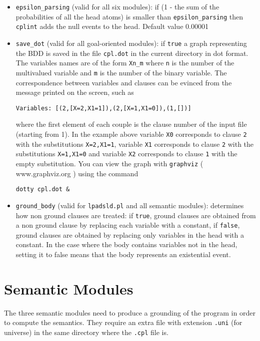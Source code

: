 \documentclass[a4paper,12pt]{article}
\newcommand{\href}[2]{\Link[#1]{}{} #2 \EndLink}
\begin{document}
\begin{itemize}
\item 
	 \verb|epsilon_parsing| (valid for all six modules): if (1 - the sum of the probabilities of all the head atoms) is smaller than 
    \verb|epsilon_parsing|
		then \texttt{cplint} adds the null events to the head. Default value 0.00001
\item 	\verb|save_dot| (valid for all goal-oriented modules): if \texttt{true} a graph representing the BDD is saved in the file \texttt{cpl.dot} in the current directory in dot format.
		The variables names are of the form \verb|Xn_m| where \texttt{n} is the number of the multivalued
		variable and \texttt{m} is the number of the binary variable. The correspondence between variables and 
		clauses can be evinced from the message printed on the screen, such as 
\begin{verbatim}
Variables: [(2,[X=2,X1=1]),(2,[X=1,X1=0]),(1,[])]
\end{verbatim}
		where the first element of each couple is the clause number of the input file (starting from 1).
		In the example above variable \texttt{X0} corresponds to clause \texttt{2} with the substitutions \texttt{X=2,X1=1},
		variable \texttt{X1} corresponds to clause \texttt{2} with the substitutions \texttt{X=1,X1=0} and
		variable \texttt{X2} corresponds to clause \texttt{1} with the empty substitution.
		You can view the graph with \texttt{graphviz} (\href{www.graphviz.org}{www.graphviz.org}) using the
		command
\begin{verbatim}
dotty cpl.dot &
\end{verbatim}
\item \verb|ground_body| (valid for \texttt{lpadsld.pl} and all semantic modules): determines how non ground clauses are treated: if \texttt{true}, ground clauses are obtained from a non ground clause by replacing each variable with a constant, if \texttt{false}, ground clauses are obtained by replacing only variables in the head with a constant. In the case where the body contains variables not in the head, setting it to false means that the body represents an existential event.
\end{itemize}

\section{Semantic Modules}
The three semantic modules need to produce a grounding of the program in order to compute the semantics.
They require an extra file with extension \texttt{.uni} (for universe) in the same directory where the \texttt{.cpl} file is.
\end{document}
